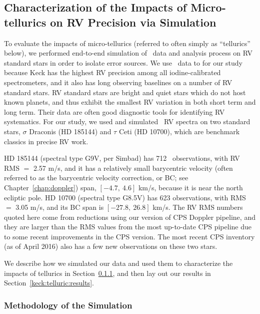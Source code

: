 \subsection{Characterization of the Impacts of Micro-tellurics on RV
  Precision via Simulation}\label{keck:telluric:impact} 

To evaluate the impacts of micro-tellurics (referred to often simply
as ``tellurics'' below), we performed end-to-end simulation of \keck\
data and analysis process on RV standard stars in order to isolate
error sources. We use \keck\ data to for our study because Keck has
the highest RV precision among all iodine-calibrated spectrometers,
and it also has long observing baselines on a number of RV standard
stars. RV standard stars are bright and quiet stars which do not host
known planets, and thus exhibit the smallest RV variation in both
short term and long term. Their data are often good diagnostic tools
for identifying RV systematics. For our study, we used and simulated
\keck\ RV spectra on two standard stars, $\sigma$ Draconis (HD 185144)
and $\tau$ Ceti (HD 10700), which are benchmark classics in precise RV
work.

HD 185144 (spectral type G9V, per Simbad) has 712 \keck\ observations,
with RV RMS $=$ 2.57 m/s, and it has a relatively small barycentric
velocity (often referred to as the barycentric velocity correction, or
BC; see Chapter~\ref{chap:doppler}) span, $[-4.7,\ 4.6]$ km/s, because
it is near the north ecliptic pole. HD 10700 (spectral type G8.5V) has
623 observations, with RMS $=$ 3.05 m/s, and its BC span is $[-27.8,\
26.8]$ km/s. The RV RMS numbers quoted here come from reductions using
our version of CPS Doppler pipeline, and they are larger than the RMS
values from the most up-to-date CPS pipeline due to some recent
improvements in the CPS version. The most recent CPS inventory (as of
April 2016) also has a few new observations on these two stars.

We describe how we simulated our data and used them to characterize
the impacts of tellurics in Section~\ref{keck:telluric:method}, and
then lay out our results in Section~\ref{keck:telluric:results}.


\subsubsection{Methodology of the Simulation}\label{keck:telluric:method}

